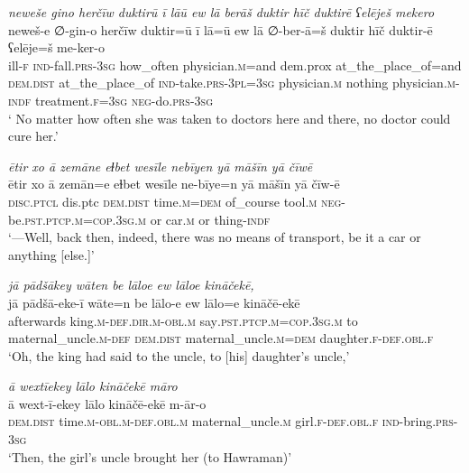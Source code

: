 \ea \label{ZP.26}
\textit{neweše gino herčīw duktirū ī lāū ew lā berāš duktir hīč duktirē ʕelēješ mekero} \\ 
\gll neweš-e ∅-gin-o herčīw duktir=ū ī lā=ū ew lā ∅-ber-ā=š duktir hīč duktir-ē ʕelēje=š me-ker-o \\ 
 ill\textsc{-f} \textsc{ind-}fall\textsc{.prs}\textsc{-3sg} how\_often physician\textsc{.m}=and dem.prox at\_the\_place\_of=and \textsc{dem.dist} at\_the\_place\_of \textsc{ind-}take\textsc{.prs}\textsc{-3pl}\textsc{=3sg} physician\textsc{.m} nothing physician\textsc{.m}\textsc{-indf} treatment\textsc{.f}\textsc{=3sg} \textsc{neg-}do\textsc{.prs}\textsc{-3sg} \\ 
\glt ` No matter how often she was taken to doctors here and there, no doctor could cure her.'
\z 
 
\ea \label{ZP.40}
\textit{ētir xo ā zemāne eɫbet wesīle nebīyen yā māšīn yā čīwē} \\ 
\gll ētir xo ā zemān=e eɫbet wesīle ne-bīye=n yā māšīn yā čīw-ē \\ 
 \textsc{disc.ptcl} dis.ptc \textsc{dem.dist} time\textsc{.m}\textsc{=dem} of\_course tool\textsc{.m} \textsc{neg-}be\textsc{.pst}\textsc{.ptcp}\textsc{.m}\textsc{=cop}\textsc{.3sg}\textsc{.m} or car\textsc{.m} or thing\textsc{-indf} \\ 
\glt `—Well, back then, indeed, there was no means of transport, be it a car or anything [else.]'
\z 
 
\ea \label{ZP.43}
\textit{jā pādšākey wāten be lāloe ew lāloe kināčekē,} \\ 
\gll jā pādšā-eke-ī wāte=n be lālo-e ew lālo=e kināčē-ekē \\ 
 afterwards king\textsc{.m}\textsc{-def}\textsc{.dir}\textsc{.m}\textsc{-obl}\textsc{.m} say\textsc{.pst}\textsc{.ptcp}\textsc{.m}\textsc{=cop}\textsc{.3sg}\textsc{.m} to maternal\_uncle\textsc{.m}\textsc{-def} \textsc{dem.dist} maternal\_uncle\textsc{.m}\textsc{=dem} daughter\textsc{.f}\textsc{-def}\textsc{.obl}\textsc{.f} \\ 
\glt `Oh, the king had said to the uncle, to [his] daughter’s uncle,'
\z 
 
\ea \label{ZP.49}
\textit{ā wextīekey lālo kināčekē māro} \\ 
\gll ā wext-ī-ekey lālo kināčē-ekē m-ār-o \\ 
 \textsc{dem.dist} time\textsc{.m}\textsc{-obl}\textsc{.m}\textsc{-def}\textsc{.obl}\textsc{.m} maternal\_uncle\textsc{.m} girl\textsc{.f}\textsc{-def}\textsc{.obl}\textsc{.f} \textsc{ind-}bring\textsc{.prs}\textsc{-3sg} \\ 
\glt `Then, the girl’s uncle brought her (to Hawraman)'
\z 
 
